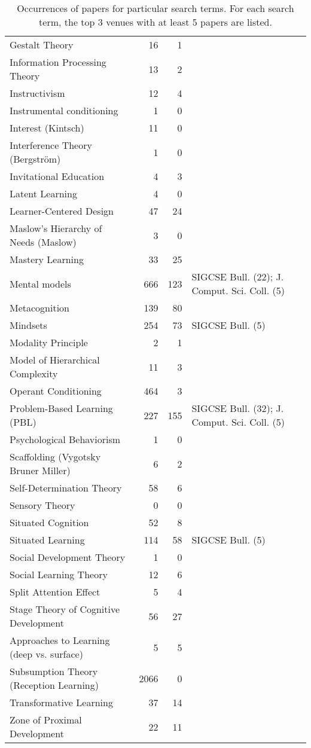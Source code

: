 \begin{table*}[t]
\begin{tabular}{lrrp{6cm}}
Gestalt Theory & 16 & 1 &  \\
Information Processing Theory & 13 & 2 &  \\
Instructivism & 12 & 4 &  \\
Instrumental conditioning & 1 & 0 &  \\
Interest (Kintsch) & 11 & 0 &  \\
Interference Theory (Bergström) & 1 & 0 &  \\
Invitational Education & 4 & 3 &  \\
Latent Learning & 4 & 0 &  \\
Learner-Centered Design & 47 & 24 &  \\
Maslow's Hierarchy of Needs (Maslow) & 3 & 0 &  \\
Mastery Learning & 33 & 25 &  \\
Mental models & 666 & 123 & SIGCSE Bull. (22); J. Comput. Sci. Coll. (5) \\
Metacognition & 139 & 80 &  \\
Mindsets & 254 & 73 & SIGCSE Bull. (5) \\
Modality Principle & 2 & 1 &  \\
Model of Hierarchical Complexity & 11 & 3 &  \\
Operant Conditioning & 464 & 3 &  \\
Problem-Based Learning (PBL) & 227 & 155 & SIGCSE Bull. (32); J. Comput. Sci. Coll. (5) \\
Psychological Behaviorism & 1 & 0 &  \\
Scaffolding (Vygotsky Bruner Miller) & 6 & 2 &  \\
Self-Determination Theory & 58 & 6 &  \\
Sensory Theory & 0 & 0 &  \\
Situated Cognition & 52 & 8 &  \\
Situated Learning & 114 & 58 & SIGCSE Bull. (5) \\
Social Development Theory & 1 & 0 &  \\
Social Learning Theory & 12 & 6 &  \\
Split Attention Effect & 5 & 4 &  \\
Stage Theory of Cognitive Development & 56 & 27 &  \\
Approaches to Learning (deep vs. surface) & 5 & 5 &  \\
Subsumption Theory (Reception Learning) & 2066 & 0 &  \\
Transformative Learning & 37 & 14 &  \\
Zone of Proximal Development & 22 & 11 &  \\
\end{tabular}
\caption{Occurrences of papers for particular search terms. For each search term, the top 3 venues with at least 5 papers are listed.}
\end{table*}

